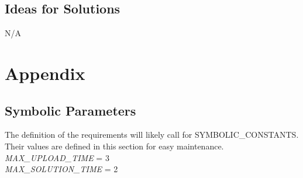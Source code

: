 \documentclass[11pt]{article}
\begin{document}
\subsection{Ideas for Solutions}
N/A





\newpage

\section{Appendix}

\subsection{Symbolic Parameters}

The definition of the requirements will likely call for SYMBOLIC\_CONSTANTS.
Their values are defined in this section for easy maintenance.\\

\noindent \emph{MAX\_UPLOAD\_TIME} = 3\\
\emph{MAX\_SOLUTION\_TIME} = 2
\end{document}
